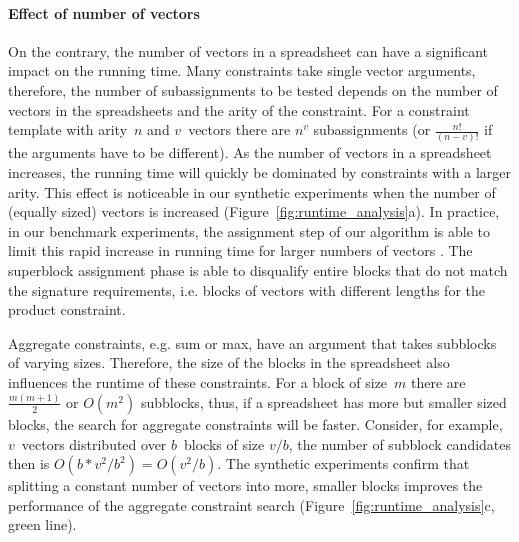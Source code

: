 \paragraph{Effect of number of vectors}
On the contrary, the number of vectors in a spreadsheet can have a significant impact on the running time.
Many constraints take single vector arguments, therefore, the number of subassignments  to be tested depends on the number of vectors in the spreadsheets and the arity of the constraint.
For a constraint template with arity~$n$ and $v$~vectors there are $n^v$ subassignments (or $\frac{n!}{(n - v)!}$ if the arguments have to be different). 
As the number of vectors in a spreadsheet increases, the running time will quickly be dominated by constraints with a larger arity.
This effect is noticeable in our synthetic experiments when the number of (equally sized) vectors  is increased (Figure~\ref{fig:runtime_analysis}a).
In practice, in our benchmark experiments, the assignment step of our algorithm is able to limit this rapid increase in running time for larger numbers of vectors .
The superblock assignment phase is able to disqualify entire blocks that do not match the signature requirements, i.e. blocks of vectors with different lengths for the product constraint.

Aggregate constraints, e.g. sum or max, have an argument that takes subblocks of varying sizes.
Therefore, the size of the blocks  in the spreadsheet also influences the runtime of these constraints.
For a block of size~$m$ there are $\frac{m(m + 1)}{2}$ or $O(m^2)$ subblocks, thus, if a spreadsheet has more but smaller sized blocks, the search for aggregate constraints will be faster.
Consider, for example, $v$~vectors distributed over $b$~blocks of size $v/b$, the number of subblock candidates then is $O(b * v^2 / b^2) = O(v^2 / b)$.
The  synthetic experiments confirm that splitting a constant number of vectors into more, smaller blocks improves the performance of the aggregate constraint search (Figure~\ref{fig:runtime_analysis}c, green line).

